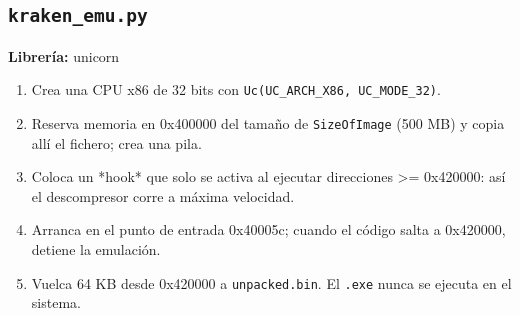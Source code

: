 \documentclass[11pt,a4paper]{article}
\begin{document}
\subsection{\texttt{kraken\_emu.py}}
\textbf{Librería:} unicorn
\begin{enumerate}

\item Crea una CPU x86 de 32 bits con \texttt{Uc(UC\_ARCH\_X86, UC\_MODE\_32)}.

\item Reserva memoria en 0x400000 del tamaño de \texttt{SizeOfImage} (500 MB) y copia allí el fichero; crea una pila.

\item Coloca un *hook* que solo se activa al ejecutar direcciones >= 0x420000: así el descompresor corre a máxima velocidad.

\item Arranca en el punto de entrada 0x40005c; cuando el código salta a 0x420000, detiene la emulación.

\item Vuelca 64 KB desde 0x420000 a \texttt{unpacked.bin}. El \texttt{.exe} nunca se ejecuta en el sistema.

\end{enumerate}
\end{document}
